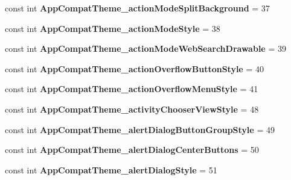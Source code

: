 \begin{DoxyCompactItemize}
const int {\bfseries App\+Compat\+Theme\+\_\+action\+Mode\+Split\+Background} = 37
\item 
\mbox{\label{classst_delivery_1_1_resource_1_1_styleable_ad9affb7e079543b02ff6ad4b5886a399}} 
const int {\bfseries App\+Compat\+Theme\+\_\+action\+Mode\+Style} = 38
\item 
\mbox{\label{classst_delivery_1_1_resource_1_1_styleable_a3f22e0a083311fd5fd04c76d94b7c790}} 
const int {\bfseries App\+Compat\+Theme\+\_\+action\+Mode\+Web\+Search\+Drawable} = 39
\item 
\mbox{\label{classst_delivery_1_1_resource_1_1_styleable_a683a2c8c74211b97720c07b01abf18aa}} 
const int {\bfseries App\+Compat\+Theme\+\_\+action\+Overflow\+Button\+Style} = 40
\item 
\mbox{\label{classst_delivery_1_1_resource_1_1_styleable_a150d3eebfad6d9a5282698b629462c48}} 
const int {\bfseries App\+Compat\+Theme\+\_\+action\+Overflow\+Menu\+Style} = 41
\item 
\mbox{\label{classst_delivery_1_1_resource_1_1_styleable_a78a097494abd188a0c793aee86c8aecb}} 
const int {\bfseries App\+Compat\+Theme\+\_\+activity\+Chooser\+View\+Style} = 48
\item 
\mbox{\label{classst_delivery_1_1_resource_1_1_styleable_af90286a973e96075753a759a3097345b}} 
const int {\bfseries App\+Compat\+Theme\+\_\+alert\+Dialog\+Button\+Group\+Style} = 49
\item 
\mbox{\label{classst_delivery_1_1_resource_1_1_styleable_a128b34733805e471d5019af44c698860}} 
const int {\bfseries App\+Compat\+Theme\+\_\+alert\+Dialog\+Center\+Buttons} = 50
\item 
\mbox{\label{classst_delivery_1_1_resource_1_1_styleable_a2518d077b559446ed985465ab0f2cfdb}} 
const int {\bfseries App\+Compat\+Theme\+\_\+alert\+Dialog\+Style} = 51
\item 

\end{DoxyCompactItemize}
